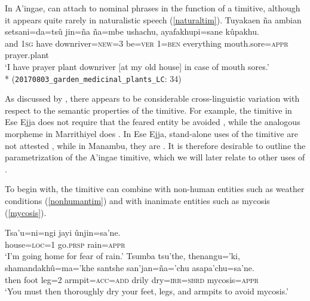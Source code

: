 \documentclass[output=paper,colorlinks,citecolor=brown]{langscibook}
\begin{document}
In A'ingae,  can attach to nominal phrases in the function of a timitive, although it appears quite rarely in naturalistic speech (\ref{naturaltim}).
    \ea \label{naturaltim} %
    \gll Tuyakaen ña     ambian setsani=da=tsû     jin=ña  ña=mbe   ushachu,   {{\ob}ayafakhupi=sane{\cb}}      kûpakhu. \\
         and      \textsc{1sg} have   downriver=\textsc{new=}3 be=\textsc{ver} \textsc{1=ben} everything {mouth.sore=\textsc{appr}} {prayer.plant} \\
    \glt `I have prayer plant downriver [at my old house] in case of mouth sores.' \\*
    \hfill (\texttt{20170803\_garden\_medicinal\_plants\_LC}: {\textsc{34}})
    \z

As discussed by \citet{vuillermet2018a}, there appears to be considerable cross-lin\-guis\-tic variation with respect to the semantic properties of the timitive. For example, the timitive in Ese Ejja does not require that the feared entity be avoided \citep{vuillermet2018a}, while the analogous morpheme in Marrithiyel does \citep{green1989marrithiyel}. In Ese Ejja, stand-alone uses of the timitive are not attested \citep{vuillermet2018a}, while in Manambu, they are \citep{aikhenvald2008manambu}. It is therefore desirable to outline the parametrization of the A'ingae timitive, which we will later relate to other uses of \sane.
    
To begin with, the timitive  can combine with non-human entities such as weath\-er conditions (\ref{nonhumantim}) and with inanimate entities such as mycosis (\ref{mycosis}).
\begin{exe}
    \ex \label{nonhumantim}
    \gll Tsa'u=ni=ngi   jayi       {\ob}ûnjin=sa'ne.{\cb} \\
         house=\textsc{loc=}1 go.\textsc{prsp} rain=\textsc{appr}  \\
    \glt `I'm going home for fear of rain.'
    \ex \label{mycosis} %
    \gll Tsumba tsu'the, thenangu='ki, shamandakhû=ma='khe santshe        san'jan=ña='chu {\ob}asapa'chu=sa'ne.{\cb} \\
         then   foot     leg\textsc{=}2      armpit=\textsc{acc=add}     drily dry=\textsc{irr=sbrd}     mycosis=\textsc{appr} \\
    \glt `You must then thoroughly dry your feet, legs, and armpits to avoid mycosis.'  \hfill \citep[p. 11]{pederson1982quinsetsse}
\end{exe}
    
\end{document}

